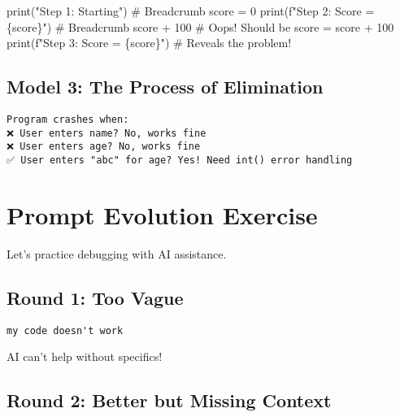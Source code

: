 \documentclass[
  letterpaper,
  DIV=11,
  numbers=noendperiod,
  oneside]{scrreprt}
\newenvironment{Shaded}{}{}
\newcommand{\BuiltInTok}[1]{\textcolor[rgb]{0.84,0.23,0.29}{#1}}
\newcommand{\CommentTok}[1]{\textcolor[rgb]{0.42,0.45,0.49}{#1}}
\newcommand{\DecValTok}[1]{\textcolor[rgb]{0.00,0.36,0.77}{#1}}
\newcommand{\NormalTok}[1]{\textcolor[rgb]{0.14,0.16,0.18}{#1}}
\newcommand{\OperatorTok}[1]{\textcolor[rgb]{0.14,0.16,0.18}{#1}}
\newcommand{\SpecialCharTok}[1]{\textcolor[rgb]{0.00,0.36,0.77}{#1}}
\newcommand{\SpecialStringTok}[1]{\textcolor[rgb]{0.01,0.18,0.38}{#1}}
\newcommand{\StringTok}[1]{\textcolor[rgb]{0.01,0.18,0.38}{#1}}
\begin{document}
\begin{Shaded}
\begin{Highlighting}[]
\BuiltInTok{print}\NormalTok{(}\StringTok{"Step 1: Starting"}\NormalTok{)        }\CommentTok{\# Breadcrumb}
\NormalTok{score }\OperatorTok{=} \DecValTok{0}
\BuiltInTok{print}\NormalTok{(}\SpecialStringTok{f"Step 2: Score = }\SpecialCharTok{\{}\NormalTok{score}\SpecialCharTok{\}}\SpecialStringTok{"}\NormalTok{) }\CommentTok{\# Breadcrumb}
\NormalTok{score }\OperatorTok{+} \DecValTok{100}  \CommentTok{\# Oops! Should be score = score + 100}
\BuiltInTok{print}\NormalTok{(}\SpecialStringTok{f"Step 3: Score = }\SpecialCharTok{\{}\NormalTok{score}\SpecialCharTok{\}}\SpecialStringTok{"}\NormalTok{) }\CommentTok{\# Reveals the problem!}
\end{Highlighting}
\end{Shaded}

\subsection{Model 3: The Process of
Elimination}\label{model-3-the-process-of-elimination}

\begin{verbatim}
Program crashes when:
❌ User enters name? No, works fine
❌ User enters age? No, works fine
✅ User enters "abc" for age? Yes! Need int() error handling
\end{verbatim}

\section{Prompt Evolution Exercise}\label{prompt-evolution-exercise-8}

Let's practice debugging with AI assistance.

\subsection{Round 1: Too Vague}\label{round-1-too-vague-8}

\begin{verbatim}
my code doesn't work
\end{verbatim}

AI can't help without specifics!

\subsection{Round 2: Better but Missing
Context}\label{round-2-better-but-missing-context}
\end{document}
